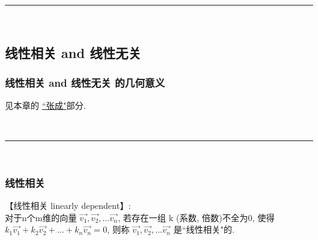 \documentclass[UTF8]{ctexart}
\begin{document}
~\\
\hrule
~\\


\subsection{线性相关 and 线性无关}

\subsubsection{线性相关 and 线性无关 的几何意义}

见本章的 \hyperlink{超链接定位符}{``张成"}部分.



~\\
\hrule
~\\

\subsubsection{线性相关}

【线性相关 linearly dependent】: \\
对于n个m维的向量 $ \vec{v_1},  \vec{v_2}, ...  \vec{v_n}$, 若存在一组 k (系数, 倍数)不全为0, 使得 $ k_1  \vec{v_1} + k_2  \vec{v_2} + ... + k_n  \vec{v_n} = 0 $, 则称 $ \vec{v_1},  \vec{v_2}, ...  \vec{v_n}$ 是``线性相关"的.\\
\end{document}
